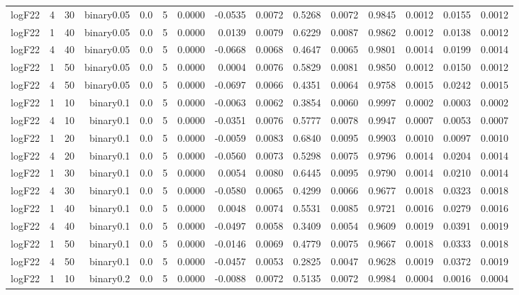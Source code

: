 \begin{longtable}{rrrrrrrrrrrrrrr}
  logF22 & 4 & 30 & binary0.05 & 0.0 & 5 & 0.0000 & -0.0535 & 0.0072 & 0.5268 & 0.0072 & 0.9845 & 0.0012 & 0.0155 & 0.0012 \\ 
  logF22 & 1 & 40 & binary0.05 & 0.0 & 5 & 0.0000 & 0.0139 & 0.0079 & 0.6229 & 0.0087 & 0.9862 & 0.0012 & 0.0138 & 0.0012 \\ 
  logF22 & 4 & 40 & binary0.05 & 0.0 & 5 & 0.0000 & -0.0668 & 0.0068 & 0.4647 & 0.0065 & 0.9801 & 0.0014 & 0.0199 & 0.0014 \\ 
  logF22 & 1 & 50 & binary0.05 & 0.0 & 5 & 0.0000 & 0.0004 & 0.0076 & 0.5829 & 0.0081 & 0.9850 & 0.0012 & 0.0150 & 0.0012 \\ 
  logF22 & 4 & 50 & binary0.05 & 0.0 & 5 & 0.0000 & -0.0697 & 0.0066 & 0.4351 & 0.0064 & 0.9758 & 0.0015 & 0.0242 & 0.0015 \\ 
  logF22 & 1 & 10 & binary0.1 & 0.0 & 5 & 0.0000 & -0.0063 & 0.0062 & 0.3854 & 0.0060 & 0.9997 & 0.0002 & 0.0003 & 0.0002 \\ 
  logF22 & 4 & 10 & binary0.1 & 0.0 & 5 & 0.0000 & -0.0351 & 0.0076 & 0.5777 & 0.0078 & 0.9947 & 0.0007 & 0.0053 & 0.0007 \\ 
  logF22 & 1 & 20 & binary0.1 & 0.0 & 5 & 0.0000 & -0.0059 & 0.0083 & 0.6840 & 0.0095 & 0.9903 & 0.0010 & 0.0097 & 0.0010 \\ 
  logF22 & 4 & 20 & binary0.1 & 0.0 & 5 & 0.0000 & -0.0560 & 0.0073 & 0.5298 & 0.0075 & 0.9796 & 0.0014 & 0.0204 & 0.0014 \\ 
  logF22 & 1 & 30 & binary0.1 & 0.0 & 5 & 0.0000 & 0.0054 & 0.0080 & 0.6445 & 0.0095 & 0.9790 & 0.0014 & 0.0210 & 0.0014 \\ 
  logF22 & 4 & 30 & binary0.1 & 0.0 & 5 & 0.0000 & -0.0580 & 0.0065 & 0.4299 & 0.0066 & 0.9677 & 0.0018 & 0.0323 & 0.0018 \\ 
  logF22 & 1 & 40 & binary0.1 & 0.0 & 5 & 0.0000 & 0.0048 & 0.0074 & 0.5531 & 0.0085 & 0.9721 & 0.0016 & 0.0279 & 0.0016 \\ 
  logF22 & 4 & 40 & binary0.1 & 0.0 & 5 & 0.0000 & -0.0497 & 0.0058 & 0.3409 & 0.0054 & 0.9609 & 0.0019 & 0.0391 & 0.0019 \\ 
  logF22 & 1 & 50 & binary0.1 & 0.0 & 5 & 0.0000 & -0.0146 & 0.0069 & 0.4779 & 0.0075 & 0.9667 & 0.0018 & 0.0333 & 0.0018 \\ 
  logF22 & 4 & 50 & binary0.1 & 0.0 & 5 & 0.0000 & -0.0457 & 0.0053 & 0.2825 & 0.0047 & 0.9628 & 0.0019 & 0.0372 & 0.0019 \\ 
  logF22 & 1 & 10 & binary0.2 & 0.0 & 5 & 0.0000 & -0.0088 & 0.0072 & 0.5135 & 0.0072 & 0.9984 & 0.0004 & 0.0016 & 0.0004 \\ 

\end{longtable}
